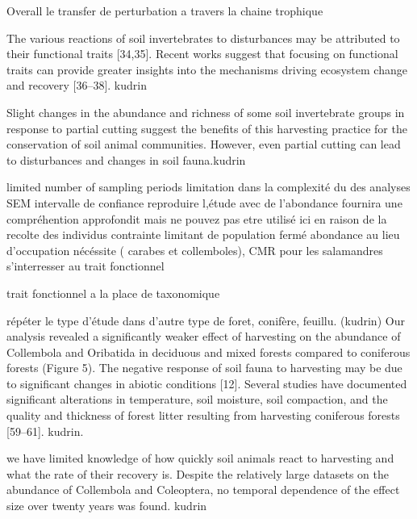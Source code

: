 

Overall le transfer de perturbation a travers la chaine trophique

The various reactions of soil invertebrates to disturbances may be attributed to their functional traits [34,35]. Recent works suggest that focusing on functional traits can provide greater insights into the mechanisms driving ecosystem change and recovery [36–38]. kudrin

Slight changes in the abundance and richness of some soil invertebrate groups in response to partial cutting suggest the benefits of this harvesting practice for the conservation of soil animal communities. However, even partial cutting can lead to disturbances and changes in soil fauna.kudrin

  limited number of sampling periods
  limitation dans la complexité du des analyses SEM
    intervalle de confiance
  reproduire l,étude avec de l'abondance fournira une compréhention approfondit mais ne pouvez pas etre utilisé ici en raison de la recolte des individus
  contrainte limitant de population fermé
  abondance au lieu d'occupation nécéssite ( carabes et collemboles), CMR pour les salamandres
  s'interresser au trait fonctionnel 

  trait fonctionnel a la place de taxonomique


  répéter le type d'étude dans d'autre type de foret, conifère, feuillu. (kudrin)
  Our analysis revealed a significantly weaker effect of harvesting on the abundance of Collembola and Oribatida in deciduous and mixed forests compared to coniferous forests (Figure 5). The negative response of soil fauna to harvesting may be due to significant changes in abiotic conditions [12]. Several studies have documented significant alterations in temperature, soil moisture, soil compaction, and the quality and thickness of forest litter resulting from harvesting coniferous forests [59–61]. kudrin.

  we have limited knowledge of how quickly soil animals react to harvesting and what the rate of their recovery is.
  Despite the relatively large datasets on the abundance of Collembola and Coleoptera, no temporal dependence of the effect size over twenty years was found. kudrin


